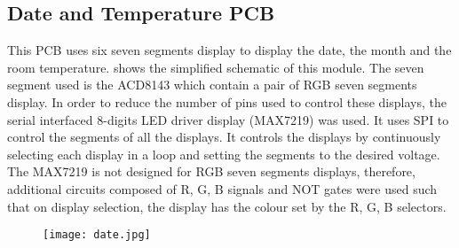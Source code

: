 \subsection{Date and Temperature PCB}
This PCB uses six seven segments display to display the date, the month and the room temperature.  shows the simplified schematic of this module. The seven segment used is the ACD8143 which contain a pair of RGB seven segments display. In order to reduce the number of pins used to control these displays, the serial interfaced 8-digits LED driver display (MAX7219) was used. It uses SPI to control the segments of all the displays. It controls the displays by continuously selecting each display in a loop and setting the segments to the desired voltage. The MAX7219 is not designed for RGB seven segments displays, therefore, additional circuits composed of R, G, B signals and NOT gates were used such that on display selection, the display has the colour set by the R, G, B selectors.   
\begin{figure}[ht]
\centering
\texttt{[image: date.jpg]}
\caption{}
\label{fig:date}
\end{figure}